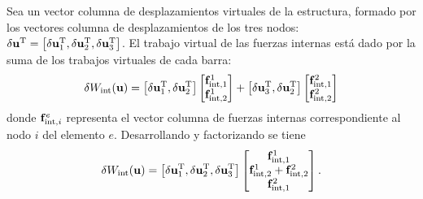 Sea un vector columna de desplazamientos virtuales de la estructura, formado por los vectores columna de desplazamientos de los tres nodos: $\delta {\bf u}^{\text{T}} = \left[ \delta{\bf u}_1^{\text{T}}, \delta{\bf u}_2^{\text{T}},  \delta{\bf u}_3^{\text{T}} \right]$. %
%
El trabajo virtual de las fuerzas internas está dado por la suma de los trabajos virtuales de cada barra:
%
\begin{equation}
\delta  W_{ \text{int} } (\bfu) %
%
=
\left[ \delta\bfu_1^{\text{T}},  \delta\bfu_2^{\text{T}} \right] 
\left[ 
\begin{matrix}
\bff_{\text{int},1}^1  \\
\bff_{\text{int},2}^1 
\end{matrix}
\right] 
+
\left[ \delta\bfu_3^{\text{T}},  \delta\bfu_2^{\text{T}} \right] 
\left[ 
\begin{matrix}
\bff_{\text{int},1}^2  \\
\bff_{\text{int},2}^2 
\end{matrix}
\right] 
\end{equation}
donde ${\bf f}_{\text{int},i}^e$ representa el vector columna de fuerzas internas correspondiente al nodo $i$ del elemento $e$. %
%
Desarrollando y factorizando se tiene
%
\begin{equation}
\delta  W_{ \text{int} } (\bfu) %
%
=
\left[ \delta\bfu_1^{\text{T}},  \delta\bfu_2^{\text{T}}, \delta\bfu_3^{\text{T}} \right] 
\left[ 
\begin{matrix}
\bff_{\text{int},1}^1  \\
\bff_{\text{int},2}^1 + \bff_{\text{int},2}^2 
\\
\bff_{\text{int},1}^2 
\end{matrix}
\right].
\end{equation}

